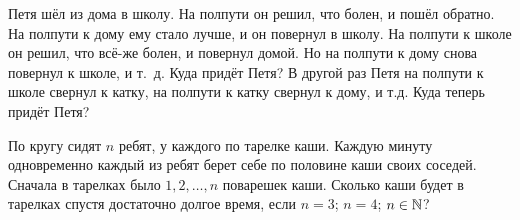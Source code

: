 \documentclass[a4paper,11pt]{article}
\begin{document}



  Петя шёл из дома в школу.
На полпути он решил, что болен, и
пошёл обратно. На полпути к дому ему стало лучше,
и он повернул в школу. На полпути к школе он решил, что
всё-же болен, и повернул домой. Но на полпути
к дому снова повернул к школе, и т.~д. Куда
придёт Петя?
 В другой раз Петя на полпути к школе свернул к катку,
на полпути к катку свернул к дому, и т.д. Куда теперь придёт Петя?






По кругу сидят $n$ ребят, у каждого по тарелке каши.
Каждую минуту одновременно %
каждый из ребят берет себе
по половине каши своих соседей. Сначала в тарелках было
$1, 2, \dots, n$ поварешек каши.
Сколько каши будет в тарелках спустя достаточно долгое время, если
 $n=3$;
 $n=4$;
 $n\in\mathbb{N}$?\\




\end{document}
